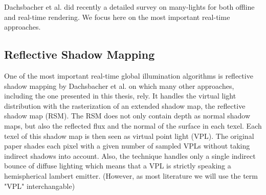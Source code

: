 \documentclass[thesis.tex]{subfiles}
\begin{document}
Dachsbacher et al. \cite{bib:manylightssurvey2014} did recently a detailed survey on many-lights for both offline and real-time rendering.
We focus here on the most important real-time approaches.

\subsection{Reflective Shadow Mapping}
One of the most important real-time global illumination algorithms is reflective shadow mapping by Dachsbacher et al. \cite{bib:reflectiveshadowmaps} on which many other approaches, including the one presented in this thesis, rely.
It handles the virtual light distribution with the rasterization of an extended shadow map, the reflective shadow map (RSM).
The RSM does not only contain depth as normal shadow maps, but also the reflected flux and the normal of the surface in each texel.
Each texel of this shadow map is then seen as virtual point light (VPL).
The original paper shades each pixel with a given number of sampled VPLs without taking indirect shadows into account.
Also, the technique handles only a single indirect bounce of diffuse lighting which means that a VPL is strictly speaking a hemispherical lambert emitter.
(However, as most literature we will use the term "VPL" interchangable)

\end{document}
